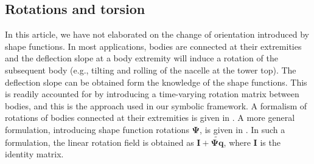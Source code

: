 \documentclass[wes, manuscript]{copernicus}
\renewcommand{\v}[1]{\boldsymbol{#1}}
\newcommand{\m}[1]{\boldsymbol{#1}}
\begin{document}
\subsection{Rotations and torsion}
In this article, we have not elaborated on the change of orientation introduced by shape functions.
In most applications, bodies are connected at their extremities and the deflection slope at a body extremity will induce a rotation of the subsequent body (e.g., tilting and rolling of the nacelle at the tower top).
The deflection slope can be obtained form the knowledge of the shape functions.
This is readily accounted for by introducing a time-varying rotation matrix between bodies, and this is the approach used in our symbolic framework.
A formalism of rotations of bodies connected at their extremities is given in \cite{branlard:2019flex}.
A more general formulation, introducing shape function rotations $\m{\Psi}$, is given in \citep{Wallrapp:1994, Schwertassek:book, Lemmer:2018}.
In such a formulation, the linear rotation field is obtained as $\m{I}+\m{\widetilde{\m{\Psi}\v{q}}}$, where $\m{I}$ is the identity matrix.
\end{document}
